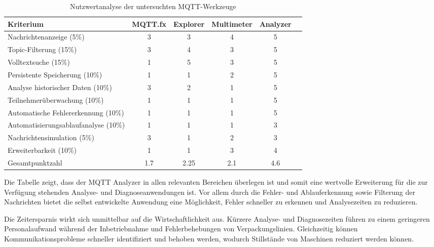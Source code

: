 \begin{table}[htbp] 
    \centering \caption{Nutzwertanalyse der untersuchten MQTT-Werkzeuge} 
    \label{tab:Werkzeugvergleich} 
    \begin{tabular}{lccccc} \hline \textbf{Kriterium} & \textbf{MQTT.fx} & \textbf{Explorer} & \textbf{Multimeter} & \textbf{Analyzer} \\ 
        \hline Nachrichtenanzeige (5\%) & 3 & 3 & 4 & 5 \\ 
        Topic-Filterung (15\%) & 3 & 4 & 3 & 5 \\ 
        Volltextsuche (15\%) & 1 & 5 & 3 & 5 \\ 
        Persistente Speicherung (10\%) & 1 & 1 & 2 & 5 \\ 
        Analyse historischer \-Daten (10\%) & 3 & 2 & 1 & 5 \\ 
        Teilnehmerüberwachung (10\%) & 1 & 1 & 1 & 5 \\ 
        Automatische Fehler\-erkennung (10\%) & 1 & 1 & 1 & 5 \\ 
        Automatisierungsablauf\-analyse (10\%) & 1 & 1 & 1 & 3 \\ 
        Nachrichtensimulation (5\%) & 3 & 1 & 2 & 3 \\ 
        Erweiterbarkeit (10\%) & 1 & 1 & 3 & 4 \\ 
        \hline Gesamtpunktzahl & 1.7 & 2.25 & 2.1 & 4.6 \\ 
        \hline 
    \end{tabular}
\end{table}

Die Tabelle zeigt, dass der MQTT Analyzer in allen relevanten Bereichen überlegen ist und somit eine wertvolle Erweiterung für die zur Verfügung stehenden Analyse- und Diagnoseanwendungen ist. Vor allem durch die Fehler- und Ablauferkennung sowie Filterung der Nachrichten bietet die selbst entwickelte Anwendung eine Möglichkeit, Fehler schneller zu erkennen und Analysezeiten zu reduzieren. 

Die Zeitersparnis wirkt sich unmittelbar auf die Wirtschaftlichkeit aus. Kürzere Analyse- und Diagnosezeiten führen zu einem geringeren Personalaufwand während der Inbetriebnahme und Fehlerbehebungen von Verpackungslinien. Gleichzeitig können Kommunikationsprobleme schneller identifiziert und behoben werden, wodurch Stillstände von Maschinen reduziert werden können.